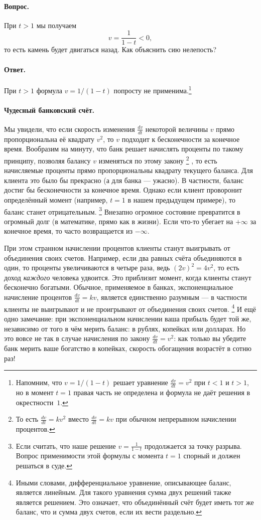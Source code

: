 \paragraph{Вопрос.}
При $t > 1$ мы получаем
\[
v = \frac{1}{1 - t} < 0,
\]
то есть камень будет двигаться назад.
Как объяснить сию нелепость?

\paragraph{Ответ.}
При $t > 1$ формула $v = 1/(1 - t)$ попросту не применима.\footnote{Напомним, что $v = 1/(1 - t)$ решает уравнение $\tfrac{dv}{dt}=v^2$ при $t<1$ и $t>1$, но в момент $t=1$ правая часть не определена и формула не даёт решения в окрестности~$1$.}

\paragraph{Чудесный банковский счёт.}
Мы увидели, что если скорость изменения $\tfrac{dv}{dt}$
некоторой величины $v$ прямо пропорциональна её квадрату $v^{2}$,
то $v$ подходит к бесконечности за конечное время.
Вообразим на минуту, что банк решает начислять проценты по такому принципу,
позволяя балансу $v$ изменяться по этому закону%
\footnote{То есть $\tfrac{dv}{dt} = kv^2$ вместо $\tfrac{dv}{dt} = kv$ при обычном непрерывном начислении процентов.}%
, то есть начисляемые проценты прямо пропорциональны квадрату текущего баланса.
Для клиента это было бы прекрасно (а для банка --- ужасно).
В частности, баланс достиг бы бесконечности за конечное время.
Однако если клиент проворонит определённый момент (например, $t = 1$ в нашем предыдущем примере), то баланс станет отрицательным.%
\footnote{Если считать, что наше решение
$v = \frac{1}{1 - t}$ продолжается за точку разрыва. Вопрос применимости этой формулы с момента $t = 1$ спорный и должен решаться в суде.}
Внезапно огромное состояние превратится в огромный долг (в математике, прямо как в жизни).
Если что-то убегает на $+\infty$ за конечное время, то часто возвращается из $-\infty$.

При этом странном начислении процентов клиенты станут выигрывать от объединения своих счетов.
Например, если два равных счёта объединяются в один,
то проценты увеличиваются в четыре раза, ведь
$(2v)^2 = 4v^2$,
то есть доход \emph{каждого} человека удвоится.
Это приблизит момент, когда клиенты станут бесконечно богатыми.
Обычное,
применяемое в банках, экспоненциальное начисление процентов
$\frac{dv}{dt} = kv$, является единственно разумным ---
в частности клиенты не выигрывают и не проигрывают
от объединения своих счетов.%
\footnote{Иными словами, дифференциальное уравнение, описывающее баланс, является линейным.
Для такого уравнения сумма двух решений также является решением.
Это означает, что объединённый счёт будет иметь тот же баланс, что и сумма двух счетов, если их вести раздельно.}
И ещё одно замечание: при экспоненциальном начислении ваша прибыль будет той же, независимо от того в чём мерить баланс: в рублях, копейках или долларах.
Но это вовсе не так в случае начисления по закону $\tfrac{dv}{dt} = v^2$:
как только вы убедите банк мерить ваше богатство в копейках, скорость обогащения возрастёт в сотню раз!

